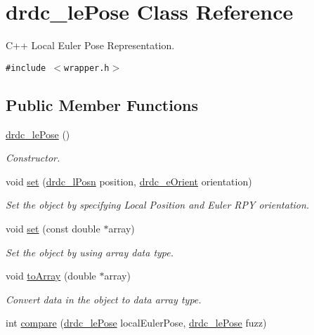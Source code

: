 \hypertarget{classdrdc__lePose}{
\section{drdc\_\-lePose Class Reference}
\label{classdrdc__lePose}
}
C++ Local Euler Pose Representation.  


{\tt \#include $<$wrapper.h$>$}

\subsection*{Public Member Functions}
\begin{CompactItemize}
\item 
\hyperlink{classdrdc__lePose_86555e5e034ed0c4410b01cb4727117f}{drdc\_\-lePose} ()
\begin{CompactList}\small\item\em Constructor. \item\end{CompactList}\item 
void \hyperlink{classdrdc__lePose_a74506b729f79df9cef6bb3607709496}{set} (\hyperlink{classdrdc__lPosn}{drdc\_\-lPosn} position, \hyperlink{classdrdc__eOrient}{drdc\_\-eOrient} orientation)
\begin{CompactList}\small\item\em Set the object by specifying Local Position and Euler RPY orientation. \item\end{CompactList}\item 
void \hyperlink{classdrdc__lePose_9e548bb34490b9d75f6bf8caaa4b0c6b}{set} (const double $\ast$array)
\begin{CompactList}\small\item\em Set the object by using array data type. \item\end{CompactList}\item 
void \hyperlink{classdrdc__lePose_71cf667ff3d208675f2cbc517f1c4345}{toArray} (double $\ast$array)
\begin{CompactList}\small\item\em Convert data in the object to data array type. \item\end{CompactList}\item 
int \hyperlink{classdrdc__lePose_961dc8435371eea28ebd6a4d9cb67269}{compare} (\hyperlink{classdrdc__lePose}{drdc\_\-lePose} localEulerPose, \hyperlink{classdrdc__lePose}{drdc\_\-lePose} fuzz)

\end{CompactItemize}
